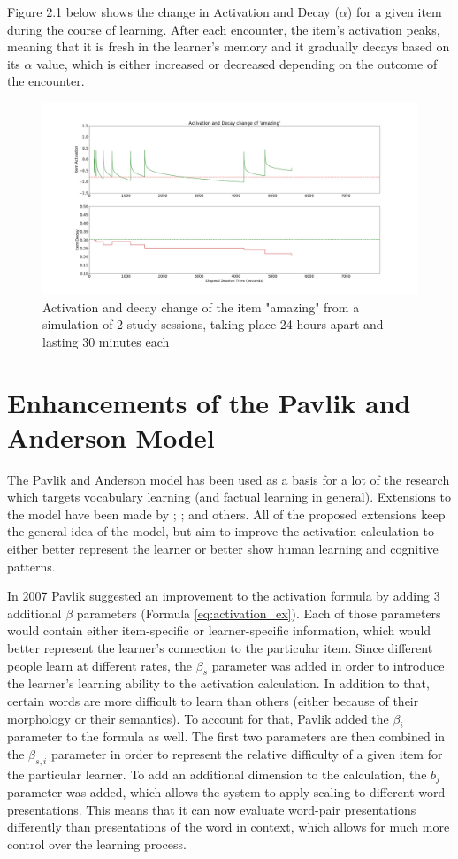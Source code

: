 \documentclass[a4paper]{report}
\begin{document}
Figure 2.1 below shows the change in Activation and Decay ($\alpha$) for a given item during the course of learning. After each encounter, the item's activation peaks, meaning that it is fresh in the learner's memory and it gradually decays based on its $\alpha$ value, which is either increased or decreased depending on the outcome of the encounter.
\begin{figure}[h]
\centering
\includegraphics[width=12cm]{graph_activation.jpg}
\caption{Activation and decay change of the item "amazing" from a simulation of 2 study sessions, taking place 24 hours apart and lasting 30 minutes each}
\label{graph_act}
\end{figure}

\section{Enhancements of the Pavlik and Anderson Model}
The Pavlik and Anderson model has been used as a basis for a lot of the research which targets vocabulary learning (and factual learning in general). Extensions to the model have been made by \cite{pavlik07}; \cite{vans09}; \cite{nijboer11} and others. All of the proposed extensions keep the general idea of the model, but aim to improve the activation calculation to either better represent the learner or better show human learning and cognitive patterns.

In 2007 Pavlik suggested an improvement to the activation formula by adding 3 additional $\beta$ parameters (Formula \ref{eq:activation_ex}). Each of those parameters would contain either item-specific or learner-specific information, which would better represent the learner's connection to the particular item. Since different people learn at different rates, the $\beta_s$ parameter was added in order to introduce the learner's learning ability to the activation calculation. In addition to that, certain words are more difficult to learn than others (either because of their morphology or their semantics). To account for that, Pavlik added the $\beta_i$ parameter to the formula as well. The first two parameters are then combined in the $\beta_{s,i}$ parameter in order to represent the relative difficulty of a given item for the particular learner. To add an additional dimension to the calculation, the $b_j$ parameter was added, which allows the system to apply scaling to different word presentations. This means that it can now evaluate word-pair presentations differently than presentations of the word in context, which allows for much more control over the learning process. \cite{pavlik07}
\end{document}
